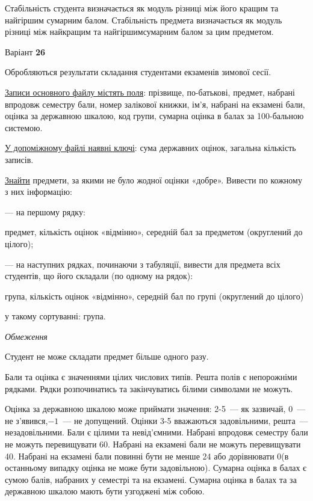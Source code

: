 \documentclass[11pt, ukrainian]{article}
\begin{document}
Стабільність студента визначається як модуль різниці між його кращим та найгіршим сумарним балом.
Стабільність предмета визначається як модуль різниці між найкращим та найгіршимсумарним балом за цим предметом.




\par
\newpage
{\center Варіант  \No \textbf { 26 }\par}
\bigskip
Обробляються результати складання студентами екзаменів зимової сесії.

\underline{Записи основного файлу містять поля}: прізвище, по-батькові, предмет, набрані впродовж семестру бали, номер залікової книжки, ім’я, набрані на екзамені бали, оцінка за державною шкалою, код групи, сумарна оцінка в балах за 100-бальною системою.

\underline{У допоміжному файлі наявні ключі}: сума державних оцінок, загальна кількість записів.

\underline{Знайти} предмети, за якими не було жодної оцінки «добре». Вивести по кожному з них інформацію:\par
{\noindent}--- на першому рядку:\par
предмет, кількість оцінок «відмінно», середній бал за предметом (округлений до цілого);

{\noindent}--- на наступних рядках, починаючи з табуляції, вивести для предмета всіх студентів, що його складали (по одному на рядок):\par
група, кількість оцінок «відмінно», середній бал по групі (округлений до цілого)

{\noindent}у такому сортуванні: група.


\bigskip\textit{Обмеження}

Студент не може складати предмет більше одного разу.

Бали та оцінка є значеннями цілих числових типів. Решта полів є непорожніми рядками.
Рядки розпочинатись та закінчуватись білими символами не можуть.

Оцінка за державною шкалою може приймати значення: 2-5~--- як зазвичай, 0~--- не з’явився,$-1$~--- не допущений. 
Оцінки 3-5 вважаються задовільними, решта~--- незадовільними. 
Бали є цілими та невід’ємними.
Набрані впродовж семестру бали не можуть перевищувати 60. 
Набрані на екзамені бали не можуть перевищувати 40. 
Набрані на екзамені бали повинні бути не менше 24 або дорівнювати 0(в останньому випадку оцінка не може бути задовільною). 
Сумарна оцінка в балах є сумою балів, набраних у семестрі та на екзамені.
Сумарна оцінка в балах та за державною шкалою мають бути узгоджені між собою.
\end{document}
